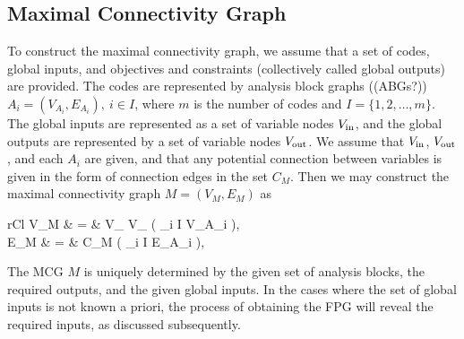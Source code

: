 \subsection{Maximal Connectivity Graph}
	\label{ss:MCG}
	To construct the maximal connectivity graph, we assume that a set of codes, global inputs, and objectives and constraints (collectively called global outputs) are provided. The codes are represented by analysis block graphs ((ABGs?)) $A_i=(V_{A_i},E_{A_i}), \ i\in I$, where $m$ is the number of codes and $I=\{1,2,\ldots,m\}$. The global inputs are represented as a set of variable nodes $V_\textrm{in}$, and the global outputs are represented by a set of variable nodes $V_\textrm{out}$. 
	We assume that $V_\textrm{in}$, $V_\textrm{out}$, and each $A_i$ are given, and that any potential connection between variables is given in the form of connection edges in the set $C_M$. 
	Then we may construct the maximal connectivity graph $M=(V_M,E_M)$ as
	\begin{IEEEeqnarray*}{rCl}
	V_M & = & V_ \cup V_ \cup \left( \bigcup_{i \in I} V_{A_i} \right), \\
	E_M & = & C_M \cup \left( \bigcup_{i \in I} E_{A_i} \right),
	\end{IEEEeqnarray*}
	The MCG $M$ is uniquely determined by the given set of analysis blocks, the required outputs, and the given global inputs. In the cases where the set of global inputs is not known a priori, the process of obtaining the FPG will reveal the required inputs, as discussed subsequently.

